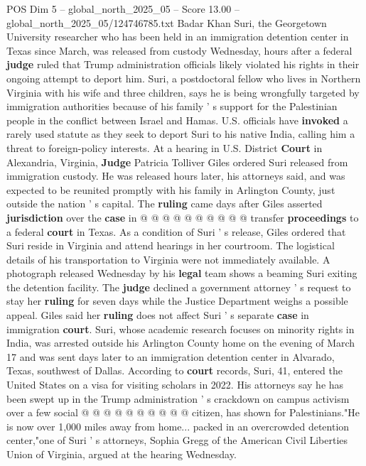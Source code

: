 \begin{textsample}{POS Dim 5 – global\_north\_2025\_05 – Score 13.00 – global\_north\_2025\_05/124746785.txt}  \label{ex:f5_pos_140}
Badar Khan Suri, the Georgetown University researcher who has been held in an immigration detention center in Texas since March, was released from custody Wednesday, hours after a federal \textbf{judge} ruled that Trump administration officials likely violated his rights in their ongoing attempt to deport him.
Suri, a postdoctoral fellow who lives in Northern Virginia with his wife and three children, says he is being wrongfully targeted by immigration authorities because of his family ' s support for the Palestinian people in the conflict between Israel and Hamas.
U.S. officials have \textbf{invoked} a rarely used statute as they seek to deport Suri to his native India, calling him a threat to foreign-policy interests.
At a hearing in U.S.
District \textbf{Court} in Alexandria, Virginia, \textbf{Judge} Patricia Tolliver Giles ordered Suri released from immigration custody.
He was released hours later, his attorneys said, and was expected to be reunited promptly with his family in Arlington County, just outside the nation ' s capital.
The \textbf{ruling} came days after Giles asserted \textbf{jurisdiction} over the \textbf{case} in @ @ @ @ @ @ @ @ @ @ transfer \textbf{proceedings} to a federal \textbf{court} in Texas.
As a condition of Suri ' s release, Giles ordered that Suri reside in Virginia and attend hearings in her courtroom.
The logistical details of his transportation to Virginia were not immediately available.
A photograph released Wednesday by his \textbf{legal} team shows a beaming Suri exiting the detention facility.
The \textbf{judge} declined a government attorney ' s request to stay her \textbf{ruling} for seven days while the Justice Department weighs a possible appeal.
Giles said her \textbf{ruling} does not affect Suri ' s separate \textbf{case} in immigration \textbf{court}.
Suri, whose academic research focuses on minority rights in India, was arrested outside his Arlington County home on the evening of March 17 and was sent days later to an immigration detention center in Alvarado, Texas, southwest of Dallas.
According to \textbf{court} records, Suri, 41, entered the United States on a visa for visiting scholars in 2022.
His attorneys say he has been swept up in the Trump administration ' s crackdown on campus activism over a few social @ @ @ @ @ @ @ @ @ @ citizen, has shown for Palestinians."He is now over 1,000 miles away from home... packed in an overcrowded detention center,"one of Suri ' s attorneys, Sophia Gregg of the American Civil Liberties Union of Virginia, argued at the hearing Wednesday.

\end{textsample}
